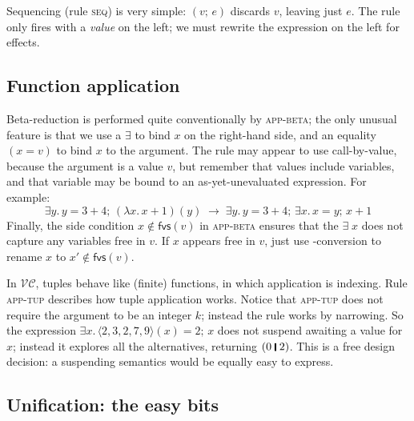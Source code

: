 \documentclass[acmsmall,review,dvipsnames]{acmart}
\newcommand{\Varid}[1]{\mathit{#1}}
\newcommand{\versecalc}{$\mathcal{VC}$}
\newcommand{\rulename}[1]{\textsc{\small #1}}
\newcommand{\freevars}[1]{\mathsf{fvs}(#1)}
\newcommand{\movesto}{\longrightarrow}
\begin{document}
Sequencing (rule \rulename{seq}) is very simple: \ensuremath{(\Varid{v};\,\Varid{e})} discards \ensuremath{\Varid{v}}, leaving just \ensuremath{\Varid{e}}.
The rule only fires with a \emph{value} on the left; we must rewrite the expression on
the left for effects.

\subsection{Function application} \label{sec:beta}

Beta-reduction is performed quite conventionally by \rulename{app-beta}; the
only unusual feature is that we use a \ensuremath{\exists} to bind \ensuremath{\Varid{x}} on the right-hand side,
and an equality \ensuremath{(\Varid{x}\mathrel{=}\Varid{v})} to bind \ensuremath{\Varid{x}} to the argument.
The rule may appear to use call-by-value, because the argument is a value \ensuremath{\Varid{v}},
but remember that values include variables, and that variable may be bound to an
as-yet-unevaluated expression.  For example:
$$
\ensuremath{\exists\Varid{y}.\,\Varid{y}\mathrel{=}\mathrm{3}\mathbin{+}\mathrm{4};\,(\lambda\Varid{x}.\,\Varid{x}\mathbin{+}\mathrm{1})(\Varid{y})}
\; \movesto \;
\ensuremath{\exists\Varid{y}.\,\Varid{y}\mathrel{=}\mathrm{3}\mathbin{+}\mathrm{4};\,\exists\Varid{x}.\,\Varid{x}\mathrel{=}\Varid{y};\,\Varid{x}\mathbin{+}\mathrm{1}}
$$
Finally, the side condition $x \not\in \freevars{v}$ in \rulename{app-beta}
ensures that the \ensuremath{\exists\;\Varid{x}}
does not capture any variables free in \ensuremath{\Varid{v}}.  If \ensuremath{\Varid{x}} appears free in \ensuremath{\Varid{v}}, just use
\textalpha-conversion to rename \ensuremath{\Varid{x}} to $x' \not\in \freevars{v}$.

In \versecalc{}, tuples behave like (finite) functions, in which application is
indexing.  Rule \rulename{app-tup} describes how tuple application works.
Notice that \rulename{app-tup} does not require the argument to be an integer $k$; instead
the rule works by narrowing.  So the expression \ensuremath{\exists\Varid{x}.\,\langle{}\mathrm{2},\mathrm{3},\mathrm{2},\mathrm{7},\mathrm{9}\rangle(\Varid{x})\mathrel{=}\mathrm{2};\,\Varid{x}}
does not suspend awaiting a value for \ensuremath{\Varid{x}}; instead it explores all the
alternatives, returning \ensuremath{(\mathrm{0}\;\rule[-0.3mm]{0.5mm}{2.5mm}\;\mathrm{2})}.  This is a free design decision:
a suspending semantics would be equally easy to express.

\subsection{Unification: the easy bits}
\end{document}
